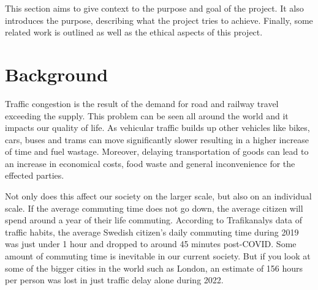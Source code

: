 


This section aims to give context to the purpose and goal of the project. It also introduces the purpose, describing what the project tries to achieve. Finally, some related work is outlined as well as the ethical aspects of this project.

\section{Background}
    Traffic congestion is the result of the demand for road and railway travel exceeding the supply. This problem can be seen all around the world\cite{inrix} and it impacts our quality of life. As vehicular traffic builds up other vehicles like bikes, cars, buses and trams can move significantly slower resulting in a higher increase of time and fuel wastage. Moreover, delaying transportation of goods can lead to an increase in economical costs, food waste and general inconvenience for the effected parties.

    Not only does this affect our society on the larger scale, but also on an individual scale. If the average commuting time does not go down, the average citizen will spend around a year of their life commuting. According to Trafikanalys data of traffic habits\cite{trafikanalys_2022}, the average Swedish citizen's daily commuting time during 2019 was just under 1 hour and dropped to around 45 minutes post-COVID. Some amount of commuting time is inevitable in our current society. But if you look at some of the bigger cities in the world such as London, an estimate of 156 hours per person was lost in just traffic delay alone during 2022\cite{inrix}.


